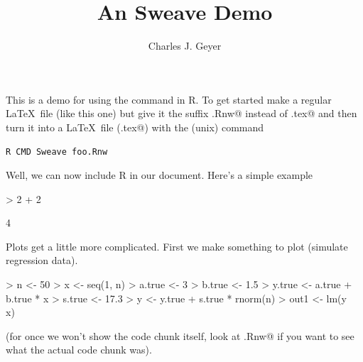 \documentclass{article}
\begin{document}


\title{An Sweave Demo}
\author{Charles J. Geyer}
\maketitle

This is a demo for using the \verb@Sweave@ command in R.  To
get started make a regular \LaTeX\ file (like this one) but
give it the suffix \verb@.Rnw@ instead of \verb@.tex@ and then
turn it into a \LaTeX\ file (\verb@foo.tex@) with the (unix) command
\begin{verbatim}
R CMD Sweave foo.Rnw
\end{verbatim}

Well, we can now include R in our document.  Here's a simple example
\begin{Schunk}
\begin{Sinput}
> 2 + 2
\end{Sinput}
\begin{Soutput}
[1] 4
\end{Soutput}
\end{Schunk}

Plots get a little more complicated.  First we make something to plot
(simulate regression data).
\begin{Schunk}
\begin{Sinput}
> n <- 50
> x <- seq(1, n)
> a.true <- 3
> b.true <- 1.5
> y.true <- a.true + b.true * x
> s.true <- 17.3
> y <- y.true + s.true * rnorm(n)
> out1 <- lm(y ~ x)
\end{Sinput}
\end{Schunk}
(for once we won't show the code chunk itself, look at \verb@foo.Rnw@
if you want to see what the actual code chunk was).
\end{document}
